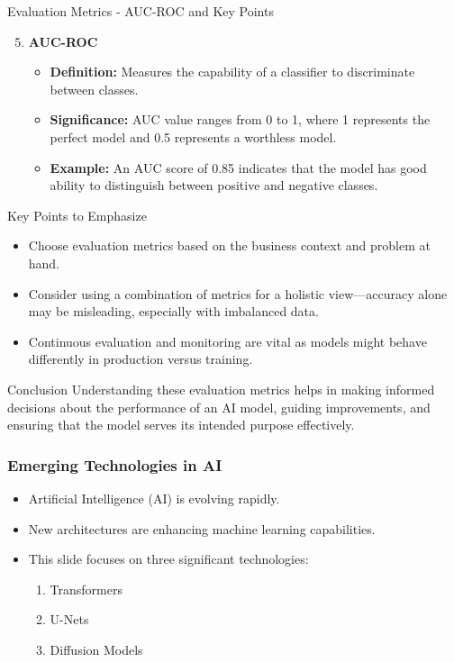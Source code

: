 \documentclass[aspectratio=169]{beamer}
\begin{document}
\begin{frame}[fragile]{Evaluation Metrics - AUC-ROC and Key Points}
    \begin{enumerate}
        \setcounter{enumi}{4}
        \item \textbf{AUC-ROC}
        \begin{itemize}
            \item \textbf{Definition:} Measures the capability of a classifier to discriminate between classes.
            \item \textbf{Significance:} AUC value ranges from 0 to 1, where 1 represents the perfect model and 0.5 represents a worthless model.
            \item \textbf{Example:} An AUC score of 0.85 indicates that the model has good ability to distinguish between positive and negative classes.
        \end{itemize}
    \end{enumerate}
    
    \begin{block}{Key Points to Emphasize}
        \begin{itemize}
            \item Choose evaluation metrics based on the business context and problem at hand.
            \item Consider using a combination of metrics for a holistic view—accuracy alone may be misleading, especially with imbalanced data.
            \item Continuous evaluation and monitoring are vital as models might behave differently in production versus training.
        \end{itemize}
    \end{block}
\end{frame}

\begin{frame}[fragile]{Conclusion}
    Understanding these evaluation metrics helps in making informed decisions about the performance of an AI model, guiding improvements, and ensuring that the model serves its intended purpose effectively.
\end{frame}

\begin{frame}[fragile]
    \frametitle{Emerging Technologies in AI}
    \begin{itemize}
        \item Artificial Intelligence (AI) is evolving rapidly.
        \item New architectures are enhancing machine learning capabilities.
        \item This slide focuses on three significant technologies:
        \begin{enumerate}
            \item Transformers
            \item U-Nets
            \item Diffusion Models
        \end{enumerate}
    \end{itemize}
\end{frame}
\end{document}
